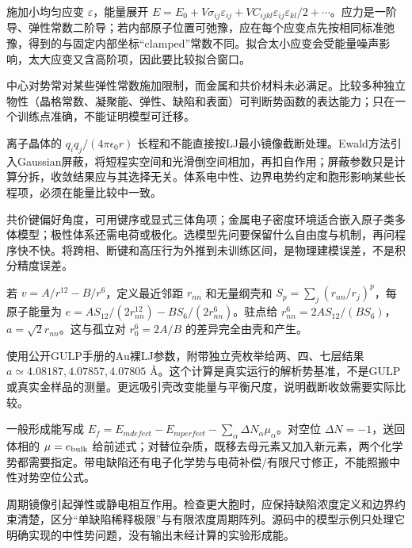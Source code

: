 施加小均匀应变 $\varepsilon$，能量展开 $E=E_0+V\sigma_{ij}\varepsilon_{ij}+VC_{ijkl}\varepsilon_{ij}\varepsilon_{kl}/2+\cdots$。应力是一阶导、弹性常数二阶导；若内部原子位置可弛豫，应在每个应变点先按相同标准弛豫，得到的与固定内部坐标“clamped”常数不同。拟合太小应变会受能量噪声影响，太大应变又含高阶项，因此要比较拟合窗口。

中心对势常对某些弹性常数施加限制，而金属和共价材料未必满足。比较多种独立物性（晶格常数、凝聚能、弹性、缺陷和表面）可判断势函数的表达能力；只在一个训练点准确，不能证明模型可迁移。

离子晶体的 $q_iq_j/(4\pi\epsilon_0r)$ 长程和不能直接按LJ最小镜像截断处理。Ewald方法引入Gaussian屏蔽，将短程实空间和光滑倒空间相加，再扣自作用；屏蔽参数只是计算分拆，收敛结果应与其选择无关。体系电中性、边界电势约定和胞形影响某些长程项，必须在能量比较中一致。

共价键偏好角度，可用键序或显式三体角项；金属电子密度环境适合嵌入原子类多体模型；极性体系还需电荷或极化。选模型先问要保留什么自由度与机制，再问程序快不快。将跨相、断键和高压行为外推到未训练区间，是物理建模误差，不是积分精度误差。

若 $v=A/r^{12}-B/r^6$，定义最近邻距 $r_{nn}$ 和无量纲壳和 $S_p=\sum_j(r_{nn}/r_j)^p$，每原子能量为 $e=AS_{12}/(2r_{nn}^{12})-BS_6/(2r_{nn}^6)$。驻点给 $r_{nn}^6=2AS_{12}/(BS_6)$，$a=\sqrt2r_{nn}$。这与孤立对 $r_0^6=2A/B$ 的差异完全由壳和产生。

使用公开GULP手册的Au裸LJ参数，附带独立壳枚举给两、四、七层结果 $a\simeq4.08187,4.07857,4.07805$ \AA{}。这个计算是真实运行的解析势基准，不是GULP或真实金样品的测量。更远吸引壳改变能量与平衡尺度，说明截断收敛需要实际比较。

一般形成能写成 $E_f=E_{
m defect}-E_{
m perfect}-\sum_\alpha\Delta N_\alpha\mu_\alpha$。对空位 $\Delta N=-1$，送回体相的 $\mu=e_{\rm bulk}$ 给前述式；对替位杂质，既移去母元素又加入新元素，两个化学势都需要指定。带电缺陷还有电子化学势与电荷补偿/有限尺寸修正，不能照搬中性对势空位公式。

周期镜像引起弹性或静电相互作用。检查更大胞时，应保持缺陷浓度定义和边界约束清楚，区分“单缺陷稀释极限”与有限浓度周期阵列。源码中的模型示例只处理它明确实现的中性势问题，没有输出未经计算的实验形成能。
